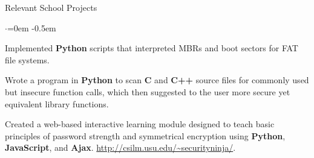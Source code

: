 \documentclass{resume} %
\begin{document}
\begin{rSection}{Relevant School Projects}
\begin{list}{$\cdot$}{\leftmargin=0em} %
   \itemsep -0.5em

	\item Implemented \textbf{Python} scripts that interpreted MBRs and boot sectors for FAT file systems.
	
	\item Wrote a program in \textbf{Python} to scan \textbf{C} and \textbf{C++} source files for commonly used but insecure function calls, which then suggested to the user more secure yet equivalent library functions.
	
	
	\item Created a web-based interactive learning module designed to teach basic principles of password strength and symmetrical encryption using \textbf{Python}, \textbf{JavaScript}, and \textbf{Ajax}. \href{http://csilm.usu.edu/~securityninja/}{http://csilm.usu.edu/\textasciitilde securityninja/}.
	
	
	
	
	
	

\end{list}

\end{rSection}
\end{document}
